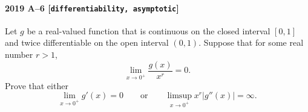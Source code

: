 \paragraph{2019 A--6 \textnormal{[\texttt{differentiability, asymptotic}]}}
Let $g$ be a real-valued function that is continuous on the closed interval $[0,1]$ and twice differentiable on
the open interval $(0,1)$. Suppose that for some real number $r>1$,
\[
\lim_{x \to 0^+} \frac{g(x)}{x^r} = 0.
\]
Prove that either
\[
\lim_{x \to 0^+} g'(x) = 0 \qquad \mbox{or} \qquad \limsup_{x \to 0^+} x^r |g''(x)| = \infty.
\]
